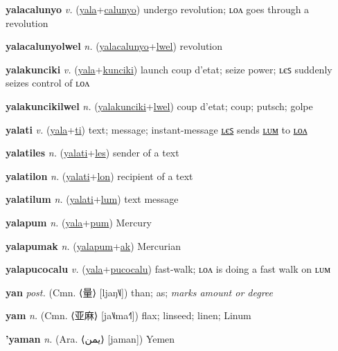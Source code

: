 \textbf{\hypertarget{yalacalunyo}{yalacalunyo}} \textit{v.} (\hyperlink{yala}{yala}+\allowbreak \hyperlink{calunyo}{calunyo})
undergo revolution; ʟᴏᴧ goes through a revolution

\textbf{\hypertarget{yalacalunyolwel}{yalacalunyolwel}} \textit{n.} (\hyperlink{yalacalunyo}{yalacalunyo}+\allowbreak \hyperlink{lwel}{lwel})
revolution

\textbf{\hypertarget{yalakunciki}{yalakunciki}} \textit{v.} (\hyperlink{yala}{yala}+\allowbreak \hyperlink{kunciki}{kunciki})
launch coup d’etat; seize power; ʟєꜱ suddenly seizes control of ʟᴏᴧ

\textbf{\hypertarget{yalakuncikilwel}{yalakuncikilwel}} \textit{n.} (\hyperlink{yalakunciki}{yalakunciki}+\allowbreak \hyperlink{lwel}{lwel})
coup d’etat; coup; putsch; golpe

\textbf{\hypertarget{yalati}{yalati}} \textit{v.} (\hyperlink{yala}{yala}+\allowbreak \hyperlink{ti}{ti})
text; message; instant-message \hyperlink{yalatiles}{ʟєꜱ} sends \hyperlink{yalatilum}{ʟᴜᴍ} to \hyperlink{yalatilon}{ʟᴏᴧ}

\textbf{\hypertarget{yalatiles}{yalatiles}} \textit{n.} (\hyperlink{yalati}{yalati}+\allowbreak \hyperlink{les}{les})
sender of a text

\textbf{\hypertarget{yalatilon}{yalatilon}} \textit{n.} (\hyperlink{yalati}{yalati}+\allowbreak \hyperlink{lon}{lon})
recipient of a text

\textbf{\hypertarget{yalatilum}{yalatilum}} \textit{n.} (\hyperlink{yalati}{yalati}+\allowbreak \hyperlink{lum}{lum})
text message

\textbf{\hypertarget{yalapum}{yalapum}} \textit{n.} (\hyperlink{yala}{yala}+\allowbreak \hyperlink{pum}{pum})
Mercury

\textbf{\hypertarget{yalapumak}{yalapumak}} \textit{n.} (\hyperlink{yalapum}{yalapum}+\allowbreak \hyperlink{ak}{ak})
Mercurian

\textbf{\hypertarget{yalapucocalu}{yalapucocalu}} \textit{v.} (\hyperlink{yala}{yala}+\allowbreak \hyperlink{pucocalu}{pucocalu})
fast-walk; ʟᴏᴧ is doing a fast walk on ʟᴜᴍ

\textbf{\hypertarget{yan}{yan}} \textit{post.} (Cmn. ⟨{\chinese{}量}⟩ [ljaŋ˥˩])
than; as; \textit{marks amount or degree}

\textbf{\hypertarget{yam}{yam}} \textit{n.} (Cmn. ⟨{\chinese{}亚麻}⟩ [ja˥˩ma˧˥])
flax; linseed; linen; Linum

\textbf{\hypertarget{'yaman}{'yaman}} \textit{n.} (Ara. ⟨{\arabics{}يمن}⟩ [jaman])
Yemen

